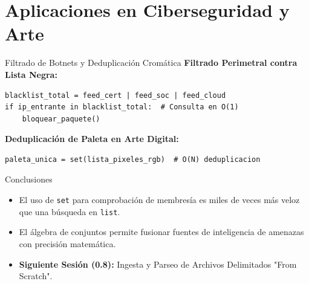\documentclass[aspectratio=169]{beamer}
\begin{document}
\section{Aplicaciones en Ciberseguridad y Arte}

\begin{frame}[fragile]{Filtrado de Botnets y Deduplicación Cromática}
    \textbf{Filtrado Perimetral contra Lista Negra:}
\begin{lstlisting}
blacklist_total = feed_cert | feed_soc | feed_cloud
if ip_entrante in blacklist_total:  # Consulta en O(1)
    bloquear_paquete()
\end{lstlisting}
    \vspace{0.2cm}
    \textbf{Deduplicación de Paleta en Arte Digital:}
\begin{lstlisting}
paleta_unica = set(lista_pixeles_rgb)  # O(N) deduplicacion
\end{lstlisting}
\end{frame}

\begin{frame}{Conclusiones}
    \begin{itemize}
        \item El uso de \texttt{set} para comprobación de membresía es miles de veces más veloz que una búsqueda en \texttt{list}.
        \item El álgebra de conjuntos permite fusionar fuentes de inteligencia de amenazas con precisión matemática.
        \item \textbf{Siguiente Sesión (0.8):} Ingesta y Parseo de Archivos Delimitados "From Scratch".
    \end{itemize}
\end{frame}
\end{document}
